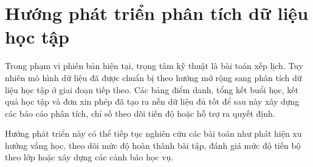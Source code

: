 \documentclass[../DoAn.tex]{subfiles}
\begin{document}
\section{Hướng phát triển phân tích dữ liệu học tập}
\label{section:5.8}

Trong phạm vi phiên bản hiện tại, trọng tâm kỹ thuật là bài toán xếp lịch. Tuy nhiên mô hình dữ liệu đã được chuẩn bị theo hướng mở rộng sang phân tích dữ liệu học tập ở giai đoạn tiếp theo. Các bảng điểm danh, tổng kết buổi học, kết quả học tập và đơn xin phép đã tạo ra nền dữ liệu đủ tốt để sau này xây dựng các báo cáo phân tích, chỉ số theo dõi tiến độ hoặc hỗ trợ ra quyết định.

Hướng phát triển này có thể tiếp tục nghiên cứu các bài toán như phát hiện xu hướng vắng học, theo dõi mức độ hoàn thành bài tập, đánh giá mức độ tiến bộ theo lớp hoặc xây dựng các cảnh báo học vụ.
\end{document}
